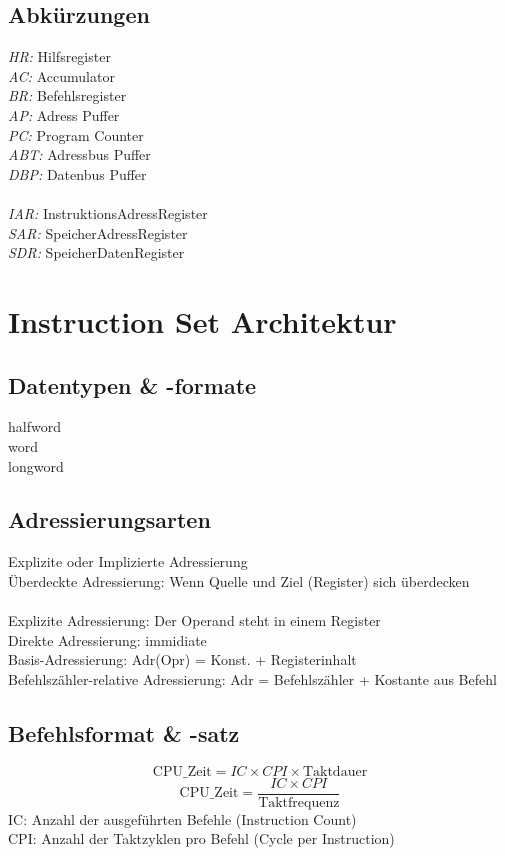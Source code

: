 \documentclass[a4paper]{scrartcl}
\begin{document}
		\subsection{Abkürzungen}
		\emph{HR:} Hilfsregister\\
		\emph{AC:} Accumulator\\
		\emph{BR:} Befehlsregister\\
		\emph{AP:} Adress Puffer\\
		\emph{PC:} Program	Counter\\
		\emph{ABT:} Adressbus Puffer\\
		\emph{DBP:} Datenbus Puffer\\
		\\
		\emph{IAR:} InstruktionsAdressRegister \\
		\emph{SAR:} SpeicherAdressRegister \\
		\emph{SDR:} SpeicherDatenRegister\\
		
	\section{Instruction Set Architektur }
		\subsection{Datentypen \& -formate}
		halfword\\
		word\\
		longword\\
		
		\subsection{Adressierungsarten}
		Explizite oder Implizierte Adressierung\\
		Überdeckte Adressierung: Wenn Quelle und Ziel (Register) sich überdecken\\
		\\
		Explizite Adressierung: Der Operand steht in einem Register\\
		Direkte Adressierung: immidiate \\
		Basis-Adressierung: Adr(Opr) = Konst. + Registerinhalt\\
		Befehlszähler-relative Adressierung: Adr = Befehlszähler + Kostante aus Befehl\\
		
		
		\subsection{Befehlsformat \& -satz}
		\[\text{CPU\_Zeit} = IC \times CPI \times \text{Taktdauer} \]
		\[\text{CPU\_Zeit} = \frac{IC \times CPI}{\text{Taktfrequenz}} \]
		IC: Anzahl der ausgeführten Befehle (Instruction Count)\\
		CPI: Anzahl der Taktzyklen pro Befehl (Cycle per Instruction)\\
		
\end{document}
